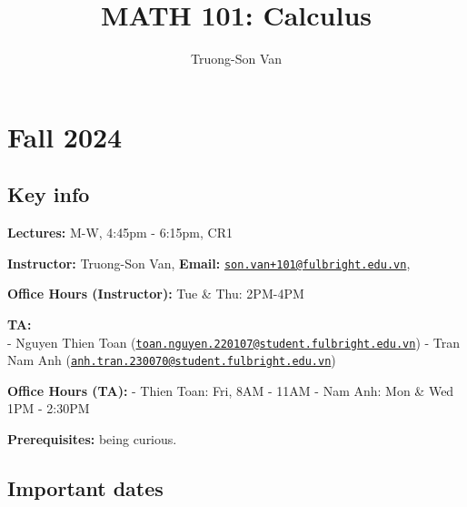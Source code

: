 \documentclass[
]{article}
\title{MATH 101: Calculus}
\author{Truong-Son Van}
\date{}
\begin{document}
\maketitle

{
\setcounter{tocdepth}{2}
\tableofcontents
}
\section*{Fall 2024}\label{fall-2024}

\subsection*{Key info}\label{key-info}

\textbf{Lectures:} M-W, 4:45pm - 6:15pm, CR1

\textbf{Instructor:} Truong-Son Van, \textbf{Email:} \href{mailto:son.van+101@fulbright.edu.vn}{\nolinkurl{son.van+101@fulbright.edu.vn}},

\textbf{Office Hours (Instructor):} Tue \& Thu: 2PM-4PM

\textbf{TA:}\\
- Nguyen Thien Toan (\href{mailto:toan.nguyen.220107@student.fulbright.edu.vn}{\nolinkurl{toan.nguyen.220107@student.fulbright.edu.vn}})
- Tran Nam Anh (\href{mailto:anh.tran.230070@student.fulbright.edu.vn}{\nolinkurl{anh.tran.230070@student.fulbright.edu.vn}})

\textbf{Office Hours (TA):}
- Thien Toan: Fri, 8AM - 11AM
- Nam Anh: Mon \& Wed 1PM - 2:30PM

\textbf{Prerequisites:} being curious.

\subsection*{Important dates}\label{important-dates}
\end{document}
